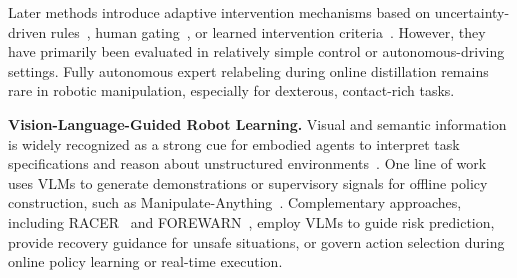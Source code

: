 Later methods introduce adaptive intervention mechanisms based on uncertainty-driven rules~\cite{menda2019ensembledagger}, human gating~\cite{kelly2019hgdagger}, or learned intervention criteria~\cite{cai2025robot}. However, they have primarily been evaluated in relatively simple control or autonomous-driving settings. Fully autonomous expert relabeling during online distillation remains rare in robotic manipulation,
especially for dexterous, contact-rich tasks.

\textbf{Vision-Language-Guided Robot Learning.}
Visual and semantic information is widely recognized as a strong 
cue for embodied agents to interpret task specifications and reason 
about unstructured environments~\cite{firoozi2025foundation,han2026multimodal}.
One line of work uses VLMs to generate demonstrations or supervisory signals
for offline policy construction, such as
Manipulate-Anything~\cite{duan2025manipulate}.
Complementary approaches, including RACER~\cite{dai2025racer} and
FOREWARN~\cite{wu2025foresight}, employ VLMs to guide risk prediction,
provide recovery guidance for unsafe situations, or govern action selection
during online policy learning or real-time execution.
